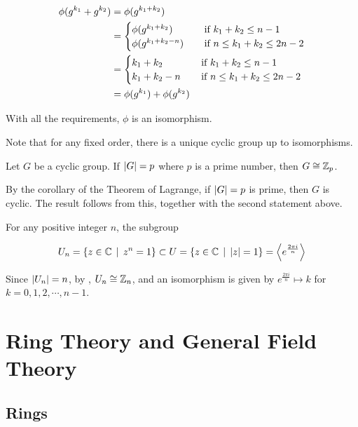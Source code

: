 \documentclass[a4paper,12pt]{article}
\begin{document}
\begin{thm}
\begin{alist}
    $$\begin{aligned}[t]
      \phi(g^{k_{1}}+g^{k_{2}})&=\phi(g^{k_{1}+k_{2}})\\
      &=\begin{cases}
        \phi(g^{k_{1}+k_{2}})&\;\;\;\;\text{if }k_{1}+k_{2}\leq n-1\\
        \phi(g^{k_{1}+k_{2}-n})&\;\;\;\;\text{if }n\leq k_{1}+k_{2}\leq 2n-2
    \end{cases}\\
    &=\begin{cases}
      k_{1}+k_{2}&\;\;\;\;\text{if }k_{1}+k_{2}\leq n-1\\
      k_{1}+k_{2}-n&\;\;\;\;\text{if }n\leq k_{1}+k_{2}\leq 2n-2
    \end{cases}\\
    &=\phi(g^{k_{1}})+\phi(g^{k_{2}})
    \end{aligned}$$\n

    With all the requirements, $\phi$ is an isomorphism.
  \end{alist}
\end{thm}\n

Note that for any fixed order, there is a unique cyclic group up to isomorphisms.\n

\begin{crl}
  Let $G$ be a cyclic group. If $\left| G\right|=p$ where $p$ is a prime number, then $G\cong\mathbb{Z}_{p}$.\n

  \prf By the corollary of the Theorem of Lagrange, if $\left| G\right|=p$ is prime, then $G$ is cyclic. The result follows from this, together with the second statement above.
\end{crl}\n

\begin{exm}
  For any positive integer $n$, the subgroup

  $$U_{n}=\left\{ z\in\mathbb{C}\,\mid\, z^{n}=1\right\}\subset U=\left\{ z\in\mathbb{C}\,\mid\, \left| z\right|=1\right\}=\left\langle e^{\frac{2\pi i}{n}}\right\rangle$$\s

  Since $\left| U_{n}\right|=n$, by \rthm[\sctr{1}], $U_{n}\cong\mathbb{Z}_{n}$, and an isomorphism is given by $e^{\frac{2\pi i}{n}}\mapsto k$ for $k=0,1,2,\cdots,n-1$.
\end{exm}

\pagebreak

\section{Ring Theory and General Field Theory}
\subsection{Rings}
\end{document}
